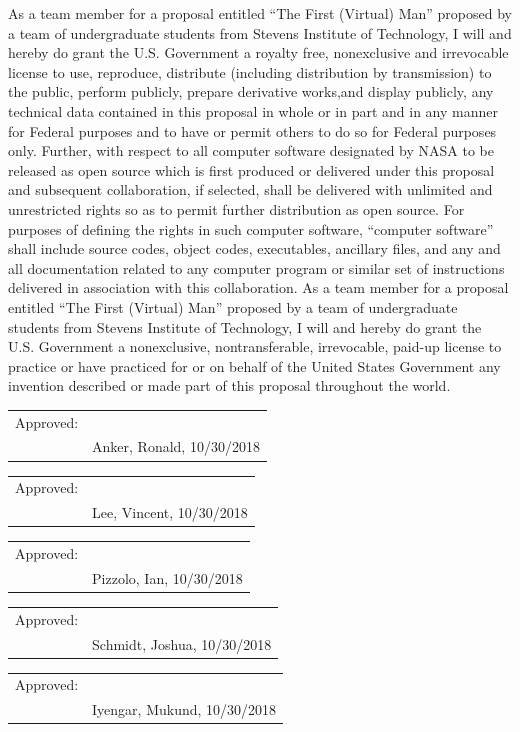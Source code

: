 \documentclass{article}
\begin{document}
As a team member for a proposal entitled “The First (Virtual) Man” 
proposed by a team of undergraduate students from Stevens Institute of 
Technology, I will and hereby do grant the U.S. Government a royalty 
free, nonexclusive and irrevocable license to use, reproduce, distribute 
(including distribution by transmission) to the public, perform 
publicly, prepare derivative works,and display publicly, any technical 
data contained in this proposal in whole or in part and in any manner 
for Federal purposes and to have or permit others to do so for
Federal purposes only. Further, with respect to all computer software 
designated by
NASA to be released as open source which is first produced or delivered 
under this
proposal and subsequent collaboration, if selected, shall be delivered 
with unlimited and
unrestricted rights so as to permit further distribution as open source. 
For purposes of
defining the rights in such computer software, “computer software” shall 
include source
codes, object codes, executables, ancillary files, and any and all 
documentation related
to any computer program or similar set of instructions delivered in 
association with this
collaboration. As a team member for a proposal entitled “The First 
(Virtual) Man” proposed by a team of undergraduate students from Stevens 
Institute of Technology, I will and hereby do
grant the U.S. Government a nonexclusive, nontransferable, irrevocable, 
paid-up
license to practice or have practiced for or on behalf of the United 
States Government
any invention described or made part of this proposal throughout the 
world.

\bigskip
\bigskip
\bigskip

\begin{tabular}{@{}p{.5in}p{3.5in}@{}}
Approved: & \hrulefill \\
& Anker, Ronald, 10/30/2018\\
\end{tabular}

\bigskip
\bigskip
\bigskip

\begin{tabular}{@{}p{.5in}p{3.5in}@{}}
Approved: & \hrulefill \\
& Lee, Vincent, 10/30/2018\\
\end{tabular}

\bigskip
\bigskip
\bigskip

\begin{tabular}{@{}p{.5in}p{3.5in}@{}}
Approved: & \hrulefill \\
& Pizzolo, Ian, 10/30/2018\\
\end{tabular}

\bigskip
\bigskip
\bigskip

\begin{tabular}{@{}p{.5in}p{3.5in}@{}}
Approved: & \hrulefill \\
& Schmidt, Joshua, 10/30/2018\\
\end{tabular}

\bigskip
\bigskip
\bigskip

\begin{tabular}{@{}p{.5in}p{3.5in}@{}}
Approved: & \hrulefill \\
& Iyengar, Mukund, 10/30/2018\\
\end{tabular}
\end{document}
